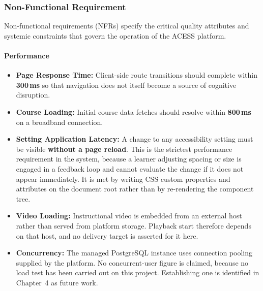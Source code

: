 \documentclass[12pt, oneside]{article} %
\newcommand{\tcode}[1]{\path{#1}}
\begin{document}
\subsubsection{Non-Functional Requirement}

Non-functional requirements (NFRs) specify the critical quality attributes and systemic constraints that govern the operation of the ACESS platform.

\paragraph{Performance}
\begin{itemize}
    \item \textbf{Page Response Time:} Client-side route transitions should complete within \textbf{300\,ms} so that navigation does not itself become a source of cognitive disruption.
    \item \textbf{Course Loading:} Initial course data fetches should resolve within \textbf{800\,ms} on a broadband connection.
    \item \textbf{Setting Application Latency:} A change to any accessibility setting must be visible \textbf{without a page reload}. This is the strictest performance requirement in the system, because a learner adjusting spacing or size is engaged in a feedback loop and cannot evaluate the change if it does not appear immediately. It is met by writing CSS custom properties and \tcode{data-*} attributes on the document root rather than by re-rendering the component tree.
    \item \textbf{Video Loading:} Instructional video is embedded from an external host rather than served from platform storage. Playback start therefore depends on that host, and no delivery target is asserted for it here.
    \item \textbf{Concurrency:} The managed PostgreSQL instance uses connection pooling supplied by the platform. No concurrent-user figure is claimed, because no load test has been carried out on this project. Establishing one is identified in Chapter~4 as future work.
\end{itemize}
\end{document}
